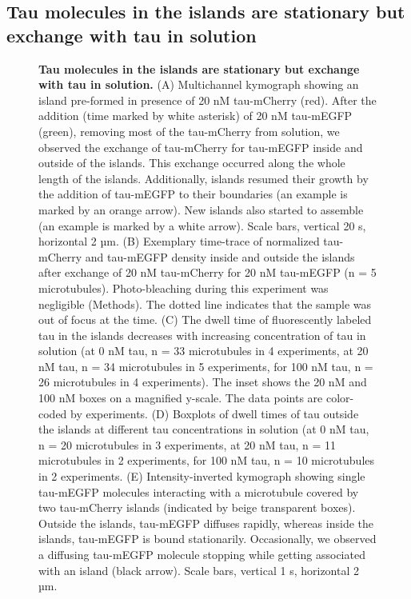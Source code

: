 \subsection{Tau molecules in the islands are stationary but exchange with tau in solution}
\begin{figure}[h!tb]
\centering
\caption[Tau molecules in the islands are stationary but exchange with tau in solution.]{
\textbf{Tau molecules in the islands are stationary but exchange with tau in solution.} (A) Multichannel kymograph showing an island pre-formed in presence of 20 nM tau-mCherry (red). After the addition (time marked by white asterisk) of 20 nM tau-mEGFP (green), removing most of the tau-mCherry from solution, we observed the exchange of tau-mCherry for tau-mEGFP inside and outside of the islands. This exchange occurred along the whole length of the islands. Additionally, islands resumed their growth by the addition of tau-mEGFP to their boundaries (an example is marked by an orange arrow). New islands also started to assemble (an example is marked by a white arrow). Scale bars, vertical 20 s, horizontal 2 µm. (B) Exemplary time-trace of normalized tau-mCherry and tau-mEGFP density inside and outside the islands after exchange of 20 nM tau-mCherry for 20 nM tau-mEGFP (n = 5 microtubules). Photo-bleaching during this experiment was negligible (Methods). The dotted line indicates that the sample was out of focus at the time. (C) The dwell time of fluorescently labeled tau in the islands decreases with increasing concentration of tau in solution (at 0 nM tau, n = 33 microtubules in 4 experiments, at 20 nM tau, n = 34 microtubules in 5 experiments, for 100 nM tau, n = 26 microtubules in 4 experiments). The inset shows the 20 nM and 100 nM boxes on a magnified y-scale. The data points are color-coded by experiments. (D) Boxplots of dwell times of tau outside the islands at different tau concentrations in solution (at 0 nM tau, n = 20 microtubules in 3 experiments, at 20 nM tau, n = 11 microtubules in 2 experiments, for 100 nM tau, n = 10 microtubules in 2 experiments. (E) Intensity-inverted kymograph showing single tau-mEGFP molecules interacting with a microtubule covered by two tau-mCherry islands (indicated by beige transparent boxes). Outside the islands, tau-mEGFP diffuses rapidly, whereas inside the islands, tau-mEGFP is bound stationarily. Occasionally, we observed a diffusing tau-mEGFP molecule stopping while getting associated with an island (black arrow). Scale bars, vertical 1 s, horizontal 2 µm.
	}\label{tau2}
\end{figure}

